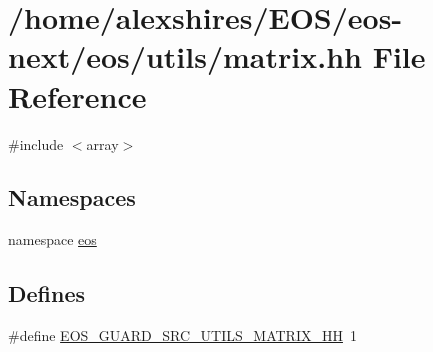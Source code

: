 \hypertarget{matrix_8hh}{
\section{/home/alexshires/EOS/eos-\/next/eos/utils/matrix.hh File Reference}
\label{matrix_8hh}
}
{\ttfamily \#include $<$array$>$}\par
\subsection*{Namespaces}
\begin{DoxyCompactItemize}
\item 
namespace \hyperlink{namespaceeos}{eos}
\end{DoxyCompactItemize}
\subsection*{Defines}
\begin{DoxyCompactItemize}
\item 
\#define \hyperlink{matrix_8hh_ad2e12ccc63e8b682bb3a09a7a9d97499}{EOS\_\-GUARD\_\-SRC\_\-UTILS\_\-MATRIX\_\-HH}~1
\end{DoxyCompactItemize}
